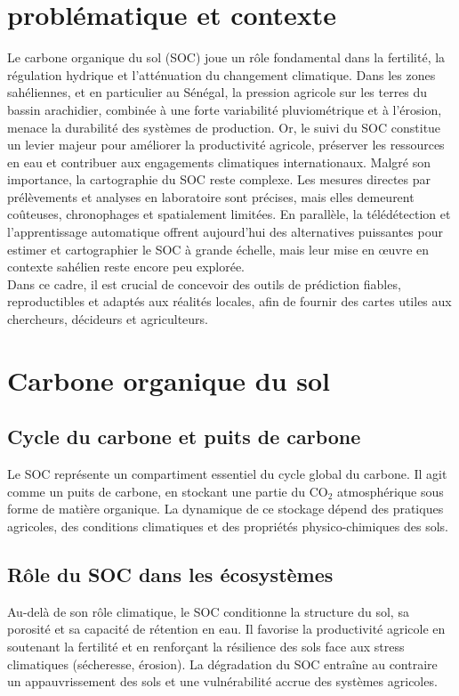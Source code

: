 \documentclass[12pt,a4paper,oneside]{report}
\begin{document}
\section{problématique et contexte}
Le carbone organique du sol (SOC) joue un rôle fondamental dans la fertilité\cite{minasny_soil_2017}, la régulation hydrique et l’atténuation du changement climatique. Dans les zones sahéliennes, et en particulier au Sénégal, la pression agricole sur les terres du bassin arachidier, combinée à une forte variabilité pluviométrique et à l’érosion, menace la durabilité des systèmes de production. Or, le suivi du SOC constitue un levier majeur pour améliorer la productivité agricole, préserver les ressources en eau et contribuer aux engagements climatiques internationaux.
Malgré son importance, la cartographie du SOC reste complexe. Les mesures directes par prélèvements et analyses en laboratoire sont précises, mais elles demeurent coûteuses, chronophages et spatialement limitées. En parallèle, la télédétection et l’apprentissage automatique offrent aujourd’hui des alternatives puissantes pour estimer et cartographier le SOC à grande échelle, mais leur mise en œuvre en contexte sahélien reste encore peu explorée.
\\
\newline
Dans ce cadre, il est crucial de concevoir des outils de prédiction fiables, reproductibles et adaptés aux réalités locales, afin de fournir des cartes utiles aux chercheurs, décideurs et agriculteurs.

\section{Carbone organique du sol}

\subsection{Cycle du carbone et puits de carbone}
Le SOC représente un compartiment essentiel du cycle global du carbone\cite{minasny_soil_2017}. Il agit comme un puits de carbone, en stockant une partie du CO$_2$ atmosphérique sous forme de matière organique. La dynamique de ce stockage dépend des pratiques agricoles, des conditions climatiques et des propriétés physico-chimiques des sols.

\subsection{Rôle du SOC dans les écosystèmes}
Au-delà de son rôle climatique, le SOC conditionne la structure du sol, sa porosité et sa capacité de rétention en eau. Il favorise la productivité agricole en soutenant la fertilité et en renforçant la résilience des sols face aux stress climatiques (sécheresse, érosion). La dégradation du SOC entraîne au contraire un appauvrissement des sols et une vulnérabilité accrue des systèmes agricoles.
\end{document}
